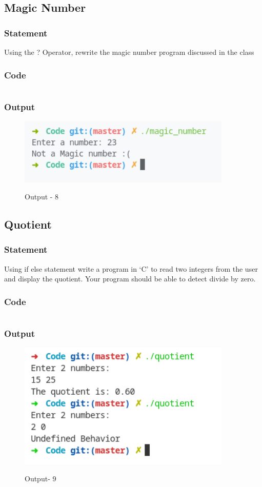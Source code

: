 \pagebreak
\subsection{Magic Number}

\subsubsection{Statement}
Using the ? Operator, rewrite the magic number program discussed in the class

\subsubsection{Code}
\inputminted[]{c}{'../Code/magic_number.cpp'}
\subsubsection{Output}
\begin{figure}[!htb]
  \centering
  \includegraphics[width=4in]{Images/magic_number.png}
  \label{output-8}
  \caption{Output - 8}
\end{figure}


\pagebreak
\subsection{Quotient}
\subsubsection{Statement}
Using if else statement write a program in ‘C’ to read two integers from the user and display
the quotient. Your program should be able to detect divide by zero.
\subsubsection{Code}
\inputminted[]{c}{../Code/quotient.cpp}
\subsubsection{Output}
\begin{figure}[!htb]
  \centering
  \includegraphics[width=4in]{Images/quotient.png}
  \label{Output-9}
  \caption{Output- 9}
\end{figure}


